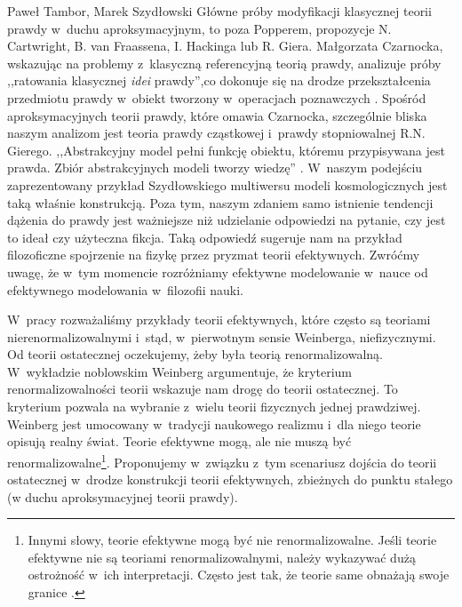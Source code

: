 \begin{artplenv}{Paweł Tambor, Marek Szydłowski}
Główne próby modyfikacji klasycznej teorii prawdy w~duchu aproksymacyjnym, to poza Popperem, propozycje N. Cartwright, B. van Fraassena, I. Hackinga lub R. Giera. Małgorzata Czarnocka, wskazując na problemy z~klasyczną referencyjną teorią prawdy, analizuje próby ,,ratowania klasycznej \textit{idei} prawdy'',co dokonuje się na drodze przekształcenia przedmiotu prawdy w~obiekt tworzony w~operacjach poznawczych
\parencite[][s.~104]{czarnocka_modyfikacje_1996}. %
 Spośród aproksymacyjnych teorii prawdy, które omawia Czarnocka, szczególnie bliska naszym analizom jest teoria prawdy cząstkowej i~prawdy stopniowalnej R.N. Gierego. ,,Abstrakcyjny model pełni funkcję obiektu, któremu przypisywana jest prawda. Zbiór abstrakcyjnych modeli tworzy wiedzę'' 
\parencite[][s.~110]{czarnocka_modyfikacje_1996}. %
 W~naszym podejściu zaprezentowany przykład Szydłowskiego multiwersu modeli kosmologicznych jest taką właśnie konstrukcją. Poza tym, naszym zdaniem samo istnienie tendencji dążenia do prawdy jest ważniejsze niż udzielanie odpowiedzi na pytanie, czy jest to ideał czy użyteczna fikcja. Taką odpowiedź sugeruje nam na przykład filozoficzne spojrzenie na fizykę przez pryzmat teorii efektywnych. Zwróćmy uwagę, że w~tym momencie rozróżniamy efektywne modelowanie w~nauce od efektywnego modelowania w~filozofii nauki.

W~pracy rozważaliśmy przykłady teorii efektywnych, które często są teoriami nierenormalizowalnymi i~stąd, w~pierwotnym sensie Weinberga, niefizycznymi. Od teorii ostatecznej oczekujemy, żeby była teorią renormalizowalną. W~wykładzie noblowskim Weinberg argumentuje, że kryterium renormalizowalności teorii wskazuje nam drogę do teorii ostatecznej. To kryterium pozwala na wybranie z~wielu teorii fizycznych jednej prawdziwej. Weinberg jest umocowany w~tradycji naukowego realizmu i~dla niego teorie opisują realny świat. Teorie efektywne mogą, ale nie muszą być renormalizowalne\footnote{Innymi słowy, teorie efektywne mogą być nie renormalizowalne. Jeśli teorie efektywne nie są teoriami renormalizowalnymi, należy wykazywać dużą ostrożność w~ich interpretacji. Często jest tak, że teorie same obnażają swoje granice
\parencites[][]{golbiak_kosmologia_2005}[][]{butryn_czy_2011}.%
}. Proponujemy w~związku z~tym scenariusz dojścia do teorii ostatecznej w~drodze konstrukcji teorii efektywnych, zbieżnych do punktu stałego (w duchu aproksymacyjnej teorii prawdy).


\end{artplenv}

